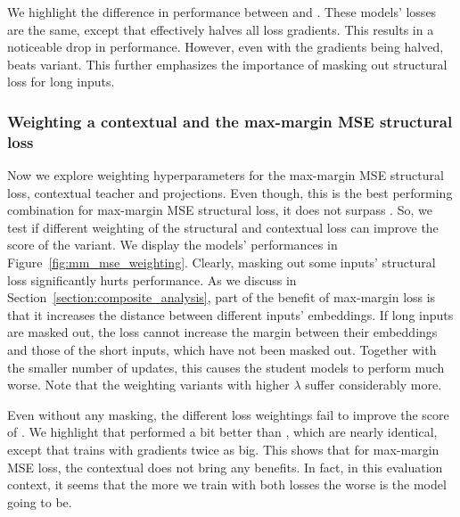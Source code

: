 We highlight the difference in performance between 
and . These models' losses are the same, except that
 effectively halves all loss gradients. This results
in a noticeable drop in performance. However, even with the gradients being
halved,  beats  variant. This
further emphasizes the importance of masking out structural loss for long
inputs.

\subsubsection{Weighting a contextual and the max-margin MSE structural
loss}

Now we explore weighting hyperparameters for the max-margin MSE structural
loss,  contextual teacher and
 projections. Even though, this is the
best performing combination for max-margin MSE structural loss, it does not
surpass . So, we test if different weighting of
the structural and contextual loss can improve the score of the
 variant. We display the models' performances in
Figure~\ref{fig:mm_mse_weighting}. Clearly, masking out some inputs' structural
loss significantly hurts performance. As we discuss in
Section~\ref{section:composite_analysis}, part of the benefit of max-margin
loss is that it increases the distance between different inputs' embeddings. If
long inputs are masked out, the loss cannot increase the margin between their
embeddings and those of the short inputs, which have not been masked out.
Together with the smaller number of updates, this causes the student models to
perform much worse. Note that the weighting variants with higher $\lambda$
suffer considerably more.

Even without any masking, the different loss weightings fail to improve the
score of . We highlight that
 performed a bit better than ,
which are nearly identical, except that  trains with
gradients twice as big. This shows that for max-margin MSE loss, the contextual
does not bring any benefits. In fact, in this evaluation context, it seems that
the more we train with both losses the worse is the model going to be.

